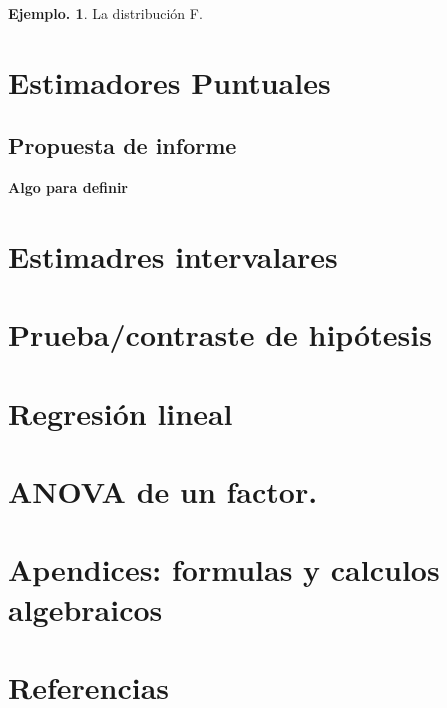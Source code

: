 \documentclass[]{book}
\theoremstyle{definition}
\theoremstyle{definition}
\newtheorem{example}{Ejemplo.}[chapter]
\theoremstyle{definition}
\theoremstyle{remark}
\begin{document}
\begin{example}
\protect\hypertarget{exm:unnamed-chunk-135}{}{\label{exm:unnamed-chunk-135} }
La distribución F.
\end{example}

\hypertarget{puntual}{%
\chapter{Estimadores Puntuales}\label{puntual}}

\hypertarget{propuesta-de-informe}{%
\section{Propuesta de informe}\label{propuesta-de-informe}}

\textbf{Algo para definir}

\hypertarget{intervalo}{%
\chapter{Estimadres intervalares}\label{intervalo}}

\hypertarget{hipo}{%
\chapter{Prueba/contraste de hipótesis}\label{hipo}}

\hypertarget{regre}{%
\chapter{Regresión lineal}\label{regre}}

\hypertarget{anova}{%
\chapter{ANOVA de un factor.}\label{anova}}

\hypertarget{apendices-formulas-y-calculos-algebraicos}{%
\chapter*{Apendices: formulas y calculos algebraicos}\label{apendices-formulas-y-calculos-algebraicos}}

\hypertarget{referencias}{%
\chapter*{Referencias}\label{referencias}}


\end{document}

